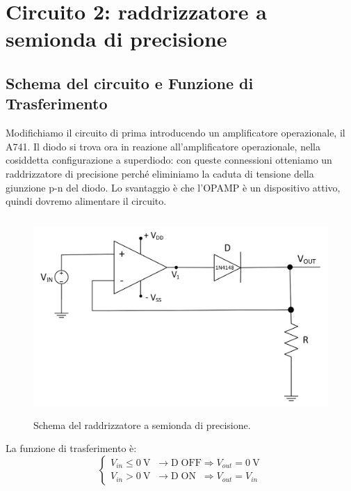 \documentclass{report}
\begin{document}
\section{Circuito 2: raddrizzatore a semionda di precisione}
\subsection{Schema del circuito e Funzione di Trasferimento}
Modifichiamo il circuito di prima introducendo un amplificatore operazionale, il \textmu A741. Il diodo si trova ora in reazione all'amplificatore operazionale, nella cosiddetta configurazione a superdiodo: con queste connessioni otteniamo un raddrizzatore di precisione perché eliminiamo la caduta di tensione della giunzione p-n del diodo. Lo svantaggio è che l'OPAMP è un dispositivo attivo, quindi dovremo alimentare il circuito.\par
\begin{figure}[h!]
	\centering
	\includegraphics[height=7.5cm]{immagini/schema2}
	\caption{Schema del raddrizzatore a semionda di precisione.}
	\label{figura:schema2}
\end{figure}
\noindent La funzione di trasferimento è:
\begin{equation}
   \begin{cases}
   V_{in}\le \SI{0}{\volt}\;\;\rightarrow \mathrm{D\;OFF} \Rightarrow V_{out} =\SI{0}{\volt}\\
   V_{in}> \SI{0}{\volt}\;\;\rightarrow \mathrm{D\;ON}\;\; \Rightarrow V_{out} = V_{in}
   \end{cases}
\end{equation}
\end{document}
